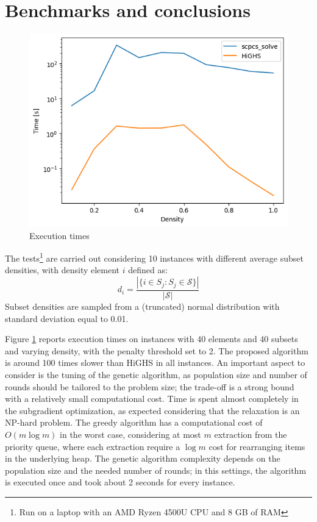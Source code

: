 \documentclass[a4paper]{article}
\begin{document}
\section{Benchmarks and conclusions}

\begin{figure}
	\centering
	\includegraphics[width=0.6\columnwidth]{benchmark.png}
	\caption{Execution times}
	\label{fig:benchmark}
\end{figure}

The tests\footnote{Run on a laptop with an AMD Ryzen 4500U CPU and 8 GB of RAM} are carried out considering 10 instances with different average subset densities, with density  element $i$ defined as:
$$
d_i = \frac{|\{i \in S_j : S_j \in \mathcal{S}\}|}{|\mathcal{S}|}
$$
Subset densities are sampled from a (truncated) normal distribution with standard deviation equal to 0.01.

Figure \ref{fig:benchmark} reports execution times on instances with 40 elements and 40 subsets and varying density, with the penalty threshold set to 2. The proposed algorithm is around 100 times slower than HiGHS in all instances. An important aspect to consider is the tuning of the genetic algorithm, as population size and number of rounds should be tailored to the problem size; the trade-off is a strong bound with a relatively small computational cost.
Time is spent almost completely in the subgradient optimization, as expected considering that the relaxation is an NP-hard problem. The greedy algorithm has a computational cost of $O(m \log m)$ in the worst case, considering at most $m$ extraction from the priority queue, where each extraction require a $\log m$ cost for rearranging items in the underlying heap. The genetic algorithm complexity depends on the population size and the needed number of rounds; in this settings, the algorithm is executed once and took about 2 seconds for every instance.



\printbibliography
\end{document}
